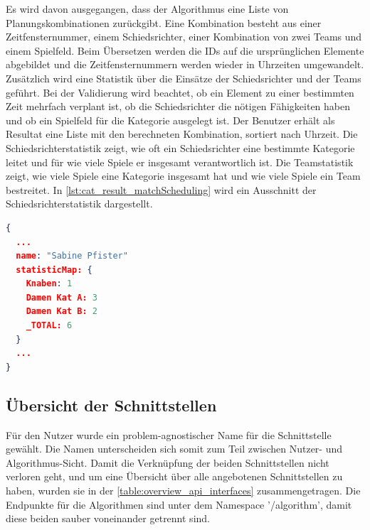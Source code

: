 Es wird davon ausgegangen, dass der Algorithmus eine Liste von Planungskombinationen zurückgibt. Eine Kombination besteht aus einer Zeitfensternummer, einem Schiedsrichter, 
einer Kombination von zwei Teams und einem Spielfeld. Beim Übersetzen werden die IDs auf die ursprünglichen Elemente abgebildet und die Zeitfensternummern werden wieder in Uhrzeiten 
umgewandelt. Zusätzlich wird eine Statistik über die Einsätze der Schiedsrichter und der Teams geführt. Bei der Validierung wird beachtet, ob ein Element zu einer 
bestimmten Zeit mehrfach verplant ist, ob die Schiedsrichter die nötigen Fähigkeiten haben und ob ein Spielfeld für die Kategorie ausgelegt ist. Der Benutzer erhält als Resultat eine Liste 
mit den berechneten Kombination, sortiert nach Uhrzeit. Die Schiedsrichterstatistik zeigt, wie oft ein Schiedsrichter eine bestimmte Kategorie leitet und für wie viele Spiele er insgesamt 
verantwortlich ist. Die Teamstatistik zeigt, wie viele Spiele eine Kategorie insgesamt hat und wie viele Spiele ein Team bestreitet. In \autoref{lst:cat_result_matchScheduling} wird ein 
Ausschnitt der Schiedsrichterstatistik dargestellt.

\begin{lstlisting}[language=JSON, caption=Ausschnitt eines Resultats einer Spielplan Erstellung, label=lst:cat_result_matchScheduling]  
{
  ...
  name: "Sabine Pfister"
  statisticMap: {
    Knaben: 1
    Damen Kat A: 3
    Damen Kat B: 2
    _TOTAL: 6
  }
  ...
}
\end{lstlisting}

\subsection{Übersicht der Schnittstellen}
Für den Nutzer wurde ein problem-agnostischer Name für die Schnittstelle gewählt. Die Namen unterscheiden sich somit zum Teil zwischen Nutzer- und Algorithmus-Sicht. Damit die 
Verknüpfung der beiden Schnittstellen nicht verloren geht, und um eine Übersicht über alle angebotenen Schnittstellen zu haben, wurden sie in der \autoref{table:overview_api_interfaces} 
zusammengetragen. Die Endpunkte für die Algorithmen sind unter dem Namespace '/algorithm', damit diese beiden sauber voneinander getrennt sind.


